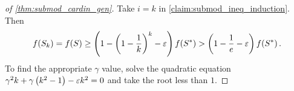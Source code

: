 \begin{proof}[of \cref{thm:submod_cardin_gen}]
    Take $i = k$ in \cref{claim:submod_ineq_induction}. Then 
    \begin{equation*}
        f \! \left( S_k \right) = f \! \left( S \right) \geq \left( 1 - \left( 1 - \frac{1}{k} \right)^k - \varepsilon \right)f \! \left( S^{\ast} \right) > \left( 1 - \frac{1}{e} - \varepsilon \right)f \! \left( S^{\ast} \right). 
    \end{equation*}
    To find the appropriate $\gamma$ value, solve the quadratic equation $\gamma^2k + \gamma \left( k^2-1 \right) - \varepsilon k^2 = 0$ and take the root less than $1$.  
\end{proof}
